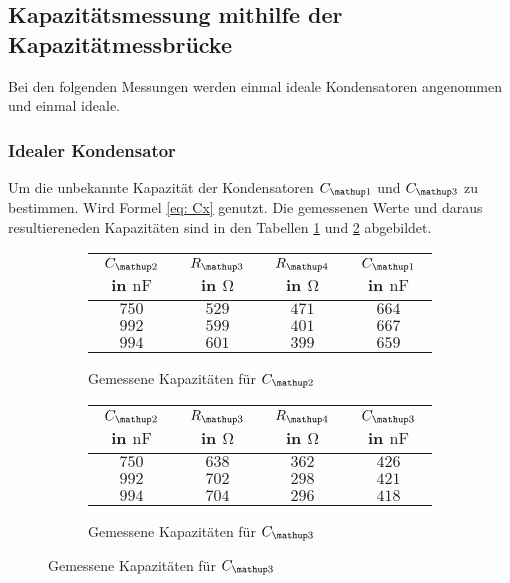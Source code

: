 \subsection{Kapazitätsmessung mithilfe der Kapazitätmessbrücke}

Bei den folgenden Messungen werden einmal 
ideale Kondensatoren angenommen und einmal ideale.

\subsubsection{Idealer Kondensator}

Um die unbekannte Kapazität der Kondensatoren $C\ua{1}$ und $C\ua{3}$
zu bestimmen. Wird Formel \eqref{eq: Cx} genutzt.
Die gemessenen Werte und daraus resultiereneden Kapazitäten sind in den 
Tabellen \ref{tab:kap_c1} und \ref{tab:kap_c3} abgebildet.

\begin{figure}
\begin{subfigure}{0.49\textwidth}
\centering
\hspace{-0.25cm}
\caption{Gemessene Kapazitäten für $C\ua{2}$}
  \label{tab:kap_c1}
\begin{tabular}{S S S S}
    \toprule
    {$C\ua{2}$ in $\si{\nano\farad}$} &  {$R\ua{3}$ in $\si{\ohm}$} & {$R\ua{4}$ in $\si{\ohm}$} & {$C\ua{1}$ in $\si{\nano\farad}$}  \\
    \midrule
     {$\num{750}$} & {$\num{529}$} &  {$\num{471}$}& {$\num{664}$}  \\
     {$\num{992}$} & {$\num{599}$}  & {$\num{401}$} & {$\num{667}$}  \\
     {$\num{994}$} & {$\num{601}$}  & {$\num{399}$} & {$\num{659}$}  \\
     \bottomrule
	\end{tabular}
 
\end{subfigure}
\hspace{0.5cm}
\begin{subfigure}{0.49\textwidth}
\centering
\caption{Gemessene Kapazitäten für $C\ua{3}$}
  \label{tab:kap_c3}
\begin{tabular}{S S S S}
      \toprule
    {$C\ua{2}$ in $\si{\nano\farad}$} &  {$R\ua{3}$ in $\si{\ohm}$} & {$R\ua{4}$ in $\si{\ohm}$} & {$C\ua{3}$ in $\si{\nano\farad}$}  \\
    \midrule
     {$\num{750}$} & {$\num{638}$}  & {$\num{362}$} & {$\num{426}$}  \\
     {$\num{992}$} & {$\num{702}$}  & {$\num{298}$} & {$\num{421}$}  \\
     {$\num{994}$} & {$\num{704}$} &  {$\num{296}$}& {$\num{418}$}  \\
     \bottomrule
  \end{tabular}
\end{subfigure}
\label{fig:tabellen_cx_3}
\end{figure}

